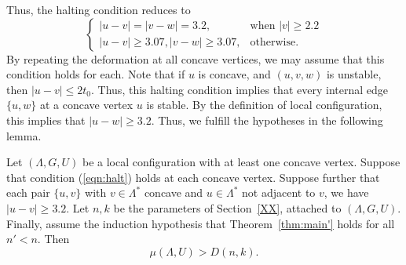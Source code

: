 Thus, the halting condition reduces to 
\begin{equation}\label{eqn:halt}
\begin{cases}
|u-v|=|v-w|=3.2,& \text{when } |v|\ge 2.2\\
|u-v|\ge 3.07, |v-w|\ge 3.07,& \text{otherwise.}
\end{cases}
\end{equation}
By repeating the deformation at all concave vertices, we may assume that this condition
holds for each.  Note that if $u$ is concave, and $(u,v,w)$ is unstable, then
$|u-v|\le 2t_0$.  Thus, this halting condition implies that every internal edge $\{u,w\}$
at a concave vertex $u$ is stable.  By the definition of local configuration, this
implies that $|u-w|\ge 3.2$.  Thus, we fulfill the hypotheses in the following lemma.

\begin{lemma}\label{lemma:concave}  
Let $(\Lambda,G,U)$ be a local configuration with at least one
concave vertex.  Suppose that 
condition (\ref{eqn:halt}) holds at each concave vertex.  Suppose further that each
pair $\{u,v\}$ with $v\in\Lambda^*$ concave and $u\in\Lambda^*$ not adjacent to $v$,
we have $|u-v|\ge 3.2$.   Let $n,k$ be the parameters of Section~\ref{XX}, attached
to $(\Lambda,G,U)$.  Finally, assume the induction hypothesis that Theorem~\ref{thm:main'}
holds for all $n'<n$. Then
   $$\mu(\Lambda,U) > D(n,k).$$
\end{lemma}

